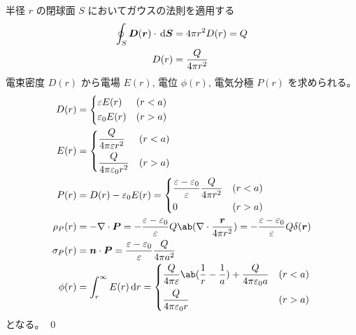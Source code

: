 \documentclass[uplatex,dvipdfmx,a4paper,11pt]{jlreq}
\makeatletter
\newcommand{\DD}{\bm{D}}
\newcommand{\PP}{\bm{P}}
\newcommand{\rr}{\bm{r}}
\renewcommand{\SS}{\bm{S}}
\newcommand{\vnabla}{\mathbf{\nabla}}
\numberwithin{equation}{section}
\theoremstyle{definition}
\renewenvironment{proof}[1][\proofname]{\par
  \normalfont
  \topsep6\p@\@plus6\p@ \trivlist
  \item[\hskip\labelsep{\bfseries #1}\@addpunct{\bfseries}]\ignorespaces\quad\par
}{%
  \qed\endtrivlist\@endpefalse
}
\renewcommand\proofname{証明}
\makeatother
\begin{document}
\begin{proposition}[中心に点電荷のある誘電体球]
\end{proposition}
\begin{proof}
  半径 $r$ の閉球面 $S$ においてガウスの法則を適用する
  \begin{align}
    \oint_S\DD(\rr)\cdot\dl{\SS} & = 4\pi r^2D(r) = Q   \\
    D(r)                         & = \frac{Q}{4\pi r^2}
  \end{align}
  電束密度 $D(r)$ から電場 $E(r)$, 電位 $\phi(r)$, 電気分極 $P(r)$ を求められる。
  \begin{align}
    D(r)        & =
    \begin{dcases}
      \varepsilon E(r)   & (r < a) \\
      \varepsilon_0 E(r) & (r > a)
    \end{dcases}                                                                                                                                                             \\
    E(r)        & =
    \begin{dcases}
      \frac{Q}{4\pi\varepsilon r^2}   & (r < a) \\
      \frac{Q}{4\pi\varepsilon_0 r^2} & (r > a)
    \end{dcases}                                                                                                                                                \\
    P(r)        & = D(r) - \varepsilon_0E(r) =
    \begin{dcases}
      \frac{\varepsilon - \varepsilon_0}{\varepsilon}\frac{Q}{4\pi r^2} & (r < a) \\
      0                                                                 & (r > a)
    \end{dcases}                                                                                                              \\
    \rho_P(r)   & = -\vnabla\cdot\PP = -\frac{\varepsilon - \varepsilon_0}{\varepsilon}Q\ab(\vnabla\cdot\frac{\rr}{4\pi r^2}) = -\frac{\varepsilon - \varepsilon_0}{\varepsilon}Q\delta(\rr) \\
    \sigma_P(r) & = \bm{n}\cdot\PP = \frac{\varepsilon - \varepsilon_0}{\varepsilon}\frac{Q}{4\pi a^2}                                                                                       \\
    \phi(r)     & = \int_r^\infty E(r)\dl{r} =
    \begin{dcases}
      \frac{Q}{4\pi\varepsilon}\ab(\frac{1}{r} - \frac{1}{a}) + \frac{Q}{4\pi\varepsilon_0 a} & (r < a) \\
      \frac{Q}{4\pi\varepsilon_0 r}                                                           & (r > a)
    \end{dcases}
  \end{align}
  となる。
\end{proof}
\end{document}
